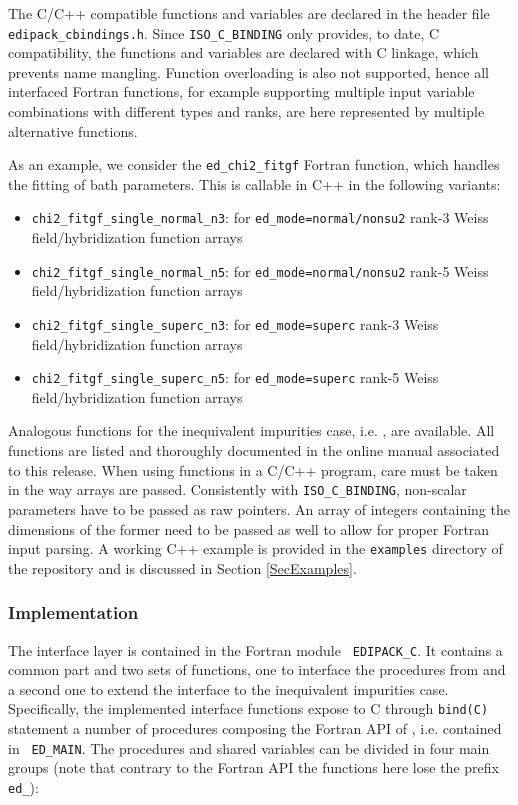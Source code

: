 \documentclass[edipack_sp.tex]{subfiles}
\begin{document}
The C/C++ compatible functions and variables 
are declared in the header file {\tt e\-di\-pack\_c\-bin\-din\-gs.h}.
Since {\tt ISO\_C\_BINDING} only provides, to date, C compatibility, the 
functions and variables are declared with C linkage, which prevents name mangling.
Function overloading is also not supported, hence all interfaced Fortran functions, for example supporting multiple input variable combinations with different types and ranks, are here represented by multiple alternative functions.

As an example, we consider the {\tt ed\_chi2\_fitgf} Fortran function, which handles the fitting of bath parameters. This is callable in C++ in the following variants:
\begin{itemize}
    \item  {\tt chi2\_fitgf\_single\_normal\_n3}: for {\tt ed\_mode=normal/nonsu2} rank-3 Weiss field/hybridization function arrays
    \item  {\tt chi2\_fitgf\_single\_normal\_n5}: for {\tt ed\_mode=normal/nonsu2} rank-5 Weiss field/hybridization function arrays
    \item  {\tt chi2\_fitgf\_single\_superc\_n3}: for {\tt ed\_mode=superc} rank-3 Weiss field/hybridization function arrays
    \item  {\tt chi2\_fitgf\_single\_superc\_n5}: for {\tt ed\_mode=superc} rank-5 Weiss field/hybridization function arrays
\end{itemize}
Analogous functions for the inequivalent impurities case, i.e. , are available. All functions are listed and thoroughly documented in the online manual associated to this release. 
When using \NAME functions in a C/C++ program, care must be taken in the way arrays are passed. Consistently with {\tt ISO\_C\_BINDING}, non-scalar parameters have to be passed as raw pointers. An array of integers containing the dimensions of the former need to be passed as well to allow for proper Fortran input parsing. A working C++ example is provided in the {\tt examples} directory of the \NAME repository and is discussed in Section \ref{SecExamples}.

\subsubsection{Implementation}\label{sSecInteropCbindingsImplementation}
The interface layer is contained in the Fortran module {\tt
  EDIPACK\_C}. It contains a common part and two sets of functions,
one to interface the procedures from \NAME and a second
one to extend the interface to the inequivalent impurities case.
Specifically, the implemented interface functions expose to C through
{\tt bind(C)} statement a number of
procedures composing the Fortran API of \NAME, i.e. contained in {\tt
  ED\_MAIN}. The procedures and shared variables can be divided in four main groups (note that contrary to the Fortran API the functions here lose the prefix {\tt ed\_}):
\end{document}
